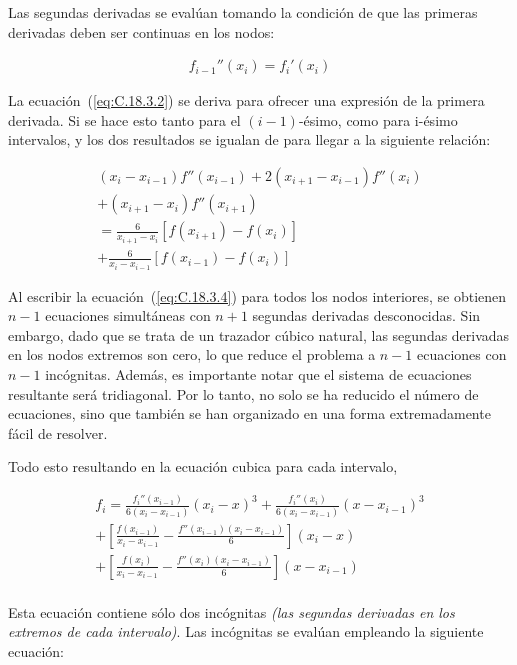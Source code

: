 \documentclass[conference]{IEEEtran}
\begin{document}
Las segundas derivadas se evalúan tomando la condición de
que las primeras derivadas deben ser continuas en los nodos:

\begin{align}
	f_{i - 1}''(x_{i}) = f_{i}'(x_{i})
	\label{eq:C.18.3.3}
\end{align}

La ecuación~(\ref{eq:C.18.3.2}) se deriva para ofrecer una expresión
de la primera derivada. Si se hace esto tanto para el $(i - 1)$-ésimo,
como para i-ésimo intervalos, y los dos resultados se igualan de
para llegar a la siguiente relación:

\begin{multline}
	(x_{i} - x_{i - 1}) f''(x_{i - 1}) + 2(x_{i + 1} - x_{i - 1})f''(x_{i}) \\
	+ (x_{i + 1} - x_{i}) f''(x_{i + 1}) \\
	= \frac{6}{x_{i + 1} - x_{i}} [f(x_{i + 1}) - f(x_{i})] \\
	+ \frac{6}{x_{i} - x_{i - 1}} [f(x_{i - 1}) - f(x_{i})]
	\label{eq:C.18.3.4}
\end{multline}

Al escribir la ecuación~(\ref{eq:C.18.3.4}) para todos los nodos interiores, se
obtienen $n - 1$ ecuaciones simultáneas con $n + 1$ segundas derivadas
desconocidas. Sin embargo, dado que se trata de un trazador cúbico natural,
las segundas derivadas en los nodos extremos son cero, lo que reduce el
problema a $n - 1$ ecuaciones con $n - 1$ incógnitas. Además, es importante
notar que el sistema de ecuaciones resultante será tridiagonal. Por lo tanto,
no solo se ha reducido el número de ecuaciones, sino que también se han
organizado en una forma extremadamente fácil de resolver.

Todo esto resultando en la ecuación cubica para cada intervalo,

\begin{multline}
	f_{i} = \frac{f_{i}''(x_{i - 1})}{6 (x_{i} - x_{i - 1})}{(x_{i} - x)}^{3}
	+ \frac{f_{i}''(x_{i})}{6 (x_{i} - x_{i - 1})}{(x - x_{i - 1})}^{3} \\
	+ [\frac{f(x_{i - 1})}{x_{i} - x_{i - 1}} - \frac{f''(x_{i - 1}) (x_{i} - x_{i - 1})}{6}](x_{i} - x) \\
	+ [\frac{f(x_{i})}{x_{i} - x_{i - 1}} - \frac{f''(x_{i}) (x_{i} - x_{i - 1})}{6}](x - x_{i - 1}) \\
	\label{eq:18.36}
\end{multline}

Esta ecuación contiene sólo dos incógnitas \textit{(las segundas derivadas en
	los extremos de cada intervalo)}. Las incógnitas se evalúan empleando la
siguiente ecuación:
\end{document}
